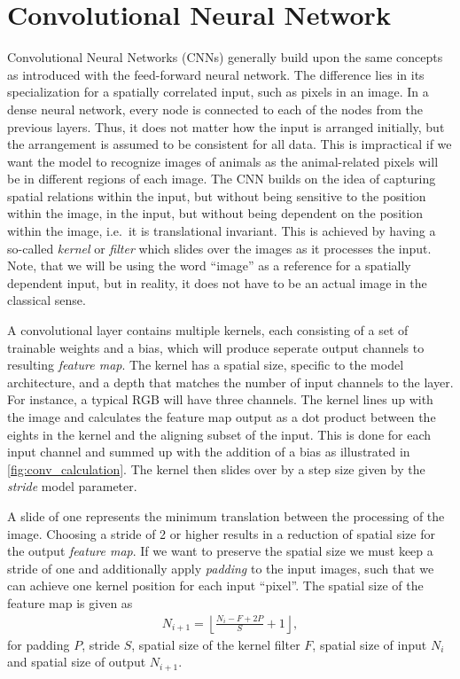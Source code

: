 \section{Convolutional Neural Network}
Convolutional Neural Networks (\acrshort{CNN}s) generally build upon the same
concepts as introduced with the feed-forward neural network. The difference lies
in its specialization for a spatially correlated input, such as pixels in an
image. In a dense neural network, every node is connected to each of the nodes
from the previous layers. Thus, it does not matter how the input is arranged
initially, but the arrangement is assumed to be consistent for all data. This is
impractical if we want the model to recognize images of animals as the
animal-related pixels will be in different regions of each image. The
\acrshort{CNN} builds on the idea of capturing spatial relations within the
input, but without being sensitive to the position within the image, in the
input, but without being dependent on the position within the image, i.e.\ it is
translational invariant. This is achieved by having a so-called \textit{kernel}
or \textit{filter} which slides over the images as it processes the input. Note,
that we will be using the word ``image'' as a reference for a spatially
dependent input, but in reality, it does not have to be an actual image in the
classical sense. 

A convolutional layer contains multiple kernels, each
consisting of a set of trainable weights and a bias, which will produce seperate output channels to resulting \textit{feature map}. The kernel has a spatial size, specific to the model architecture, and a depth that matches the number of input channels to the layer. For instance, a typical RGB will have three channels. The kernel lines up with the image and calculates the feature map output as a dot product between the eights in the kernel and the aligning subset of the input. This is done for each input channel and summed up with the addition of a bias as illustrated in \cref{fig:conv_calculation}. The kernel then slides over by a step size given by the \textit{stride} model parameter. 


%
%
%
%

A slide of one represents the minimum
translation between the processing of the image. Choosing a stride of 2 or
higher results in a reduction of spatial size for the output \textit{feature
map}. If we want to preserve the spatial size we must keep a stride of one and
additionally apply \textit{padding} to the input images, such that we can
achieve one kernel position for each input ``pixel''. The spatial size of the
feature map is given as
\begin{align}
  N_{i+1} = \left\lfloor \frac{N_i - F + 2P}{S} + 1 \right\rfloor,
  \label{eq:down_scaling}
\end{align}
for padding $P$, stride $S$, spatial size of the kernel filter $F$, spatial size
of input $N_i$ and spatial size of output $N_{i+1}$. 





